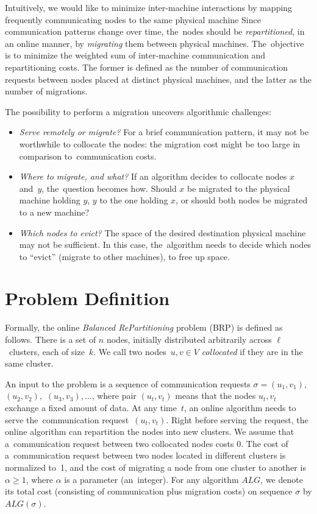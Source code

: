 \documentclass[manuscript,screen=true]{acmart}
\begin{document}
Intuitively, we would like to minimize inter-machine
interactions by mapping frequently communicating nodes to the same physical machine
Since communication patterns change over time, the~nodes should be \emph{repartitioned}, in
an online manner, by \emph{migrating} them between physical machines.
The~objective is to minimize the weighted sum of inter-machine communication and repartitioning costs.
The former is defined as the number of communication requests between nodes placed at distinct physical machines, and the latter as the number of migrations.


The possibility to perform a migration uncovers algorithmic challenges:
\begin{itemize}

\item \emph{Serve remotely or migrate?} For a brief communication
pattern, it may not be worthwhile to collocate the nodes: the migration cost might
be too large in comparison to~communication costs.

\item \emph{Where to migrate, and what?}
If an algorithm decides to collocate nodes $x$ and~$y$, the~question becomes
how. Should $x$ be migrated to the physical machine holding $y$, $y$ to the one holding
$x$, or should both nodes be migrated to a new machine?

\item \emph{Which nodes to evict?}
The space of the desired destination physical machine may not be sufficient. In
this case, the~algorithm needs to decide which nodes to ``evict'' (migrate to
other machines), to free up space.

\end{itemize}


\section{Problem Definition}
\label{sec:problem-definition}

Formally, the online \emph{Balanced RePartitioning} problem (BRP) is defined as
follows. There is a set of $n$ nodes, initially distributed arbitrarily
across $\ell$~clusters, each of size~$k$. We call two nodes~$u,v\in V$
\emph{collocated} if they are in the same cluster.

An input to the problem is a sequence of communication requests $\sigma =
(u_1,v_1),$ $(u_2,v_2),$ $(u_3,v_3), \ldots$, where pair $(u_t,v_t)$ means that
the nodes $u_t,v_t$ exchange a fixed amount of data.  At any time~$t$, an online algorithm needs to serve the~communication
request~$(u_t,v_t)$. Right before serving the request, the online algorithm
can repartition the nodes into new clusters. We assume that
a~communication request between two collocated nodes costs 0. The cost of a~communication request between two nodes located in different clusters is
normalized to~1, and the cost of migrating a node from one cluster to another
is~$\alpha \geq 1$, where $\alpha$ is a parameter (an~integer). For any
algorithm $ALG$, we denote its total cost (consisting of communication plus
migration costs) on sequence $\sigma$ by $ALG(\sigma)$.
\end{document}
